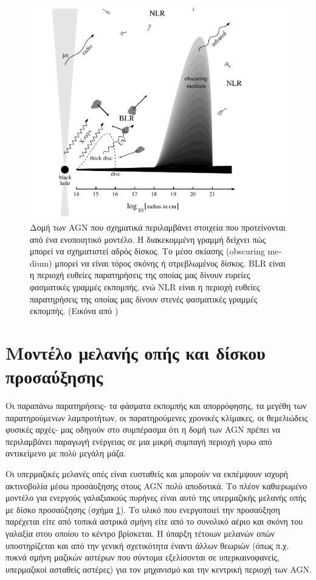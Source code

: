 \begin{figure} \includegraphics[width=1.2\linewidth]{Figures/AGNstucture.png} \caption{Δομή των \textlatin{AGN} που σχηματικά περιλαμβάνει στοιχεία που προτείνονται από ένα ενοποιητικό μοντέλο. Η διακεκομμένη γραμμή δείχνει πώς μπορεί να σχηματιστεί αδρός δίσκος. Το μέσο σκίασης \textlatin{(obscuring medium)} μπορεί να είναι τόρος σκόνης ή στρεβλωμένος δίσκος. \textlatin{BLR} είναι η περιοχή ευθείες παρατηρήσεις της οποίας μας δίνουν ευρείες φασματικές γραμμές εκπομπής, ενώ \textlatin{ΝLR} είναι η περιοχή ευθείες παρατηρήσεις της οποίας μας δίνουν στενές φασματικές γραμμές εκπομπής. (Εικόνα από \cite{AccrPower})}\label{fig:AGNstructure} \end{figure}

\section{Μοντέλο μελανής οπής και δίσκου προσαύξησης}

Οι παραπάνω παρατηρήσεις- τα φάσματα εκπομπής και απορρόφησης, τα μεγέθη των παρατηρούμενων λαμπροτήτων, οι παρατηρούμενες χρονικές κλίμακες, οι θεμελιώδεις φυσικές αρχές- μας οδηγούν στο συμπέρασμα ότι η δομή των \textlatin{AGN} πρέπει να περιλαμβάνει παραγωγή ενέργειας σε μια μικρή συμπαγή περιοχή γυρω από αντικείμενο με πολύ μεγάλη μάζα.

Οι υπερμαζικές μελανές οπές είναι ευσταθείς και μπορούν να εκπέμψουν ισχυρή ακτινοβολία μέσω προσάυξησης στους \textlatin{AGN} πολύ αποδοτικά. Το πλέον καθιερωμένο μοντέλο για ενεργούς γαλαξιακούς πυρήνες είναι αυτό της υπερμαζικής μελανής οπής με δίσκο προσαύξησης (σχήμα \ref{fig:AGNstructure}). Το υλικό που ενεργοποιεί την προσαύξηση παρέχεται είτε από τοπικά αστρικά σμήνη είτε από το συνολικό αέριο και σκόνη του γαλαξία στου οποίου το κέντρο βρίσκεται\cite{AccrPower}. 
Η ύπαρξη τέτοιων μελανών οπών υποστηρίζεται και από την γενική σχετικότητα έναντι άλλων θεωριών (όπως π.χ. πυκνά σμήνη μαζικών αστέρων που σύντομα εξελίσονται σε υπερκαινοφανείς, υπερμαζικοί ασταθείς αστέρες) για τον μηχανισμό και την κεντρική περιοχή των \textlatin{AGN}\cite{AccrPower}.

